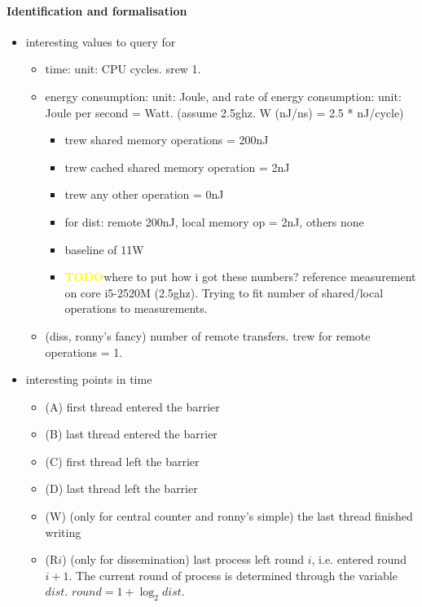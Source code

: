 \documentclass[a4paper, 10pt]{article}
\def \todo{\textbf{\textcolor{yellow}{TODO}}}
\begin{document}
\paragraph{Identification and formalisation}
\label{ssssec:analysis-modelchecking-quantitative-properties-identification}
\begin{itemize}
	\item interesting values to query for
		\begin{itemize}
			\item time: unit: CPU cycles. srew 1.
			\item energy consumption: unit: Joule, and rate of energy consumption: unit: Joule per second = Watt. (assume 2.5ghz. W (nJ/ns) = 2.5 * nJ/cycle)
				\begin{itemize}
					\item trew shared memory operations = 200nJ
					\item trew cached shared memory operation = 2nJ
					\item trew any other operation = 0nJ
					\item for dist: remote 200nJ, local memory op = 2nJ, others none
					\item baseline of 11W
					\item \todo where to put how i got these numbers? reference measurement on core i5-2520M (2.5ghz). Trying to fit number of shared/local operations to measurements.
				\end{itemize}
			\item (diss, ronny's fancy) number of remote transfers. trew for remote operations = 1.
		\end{itemize}
	\item interesting points in time
		\begin{itemize}
			\item (A) first thread entered the barrier
			\item (B) last thread entered the barrier
			\item (C) first thread left the barrier
			\item (D) last thread left the barrier
			\item (W) (only for central counter and ronny's simple) the last thread finished writing
			\item (R$i$) (only for dissemination) last process left round $i$, i.e. entered round $i+1$. The current round of process is determined through the variable $\mathit{dist}$. $\mathit{round} = 1 + \log_2 \mathit{dist}$.
		\end{itemize}

\end{itemize}
\end{document}
